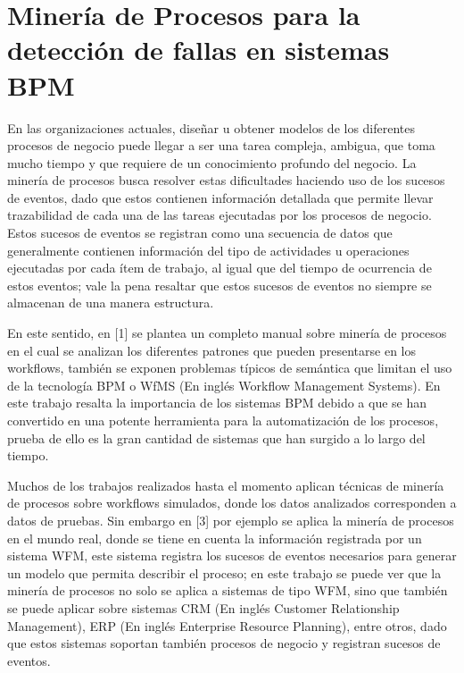 \section{Minería de Procesos para la detección de fallas en sistemas BPM} %
\label{section1.3}

En las organizaciones actuales, diseñar u obtener modelos de los diferentes procesos de negocio puede llegar a ser una tarea compleja, ambigua, que toma mucho tiempo y que requiere de un conocimiento profundo del negocio. La minería de procesos busca resolver estas dificultades haciendo uso de los sucesos de eventos, dado que estos contienen información detallada que permite llevar trazabilidad de cada una de las tareas ejecutadas por los procesos de negocio. Estos sucesos de eventos se registran como una secuencia de datos que generalmente contienen información del tipo de actividades u operaciones ejecutadas por cada ítem de trabajo, al igual que del tiempo de ocurrencia de estos eventos; vale la pena resaltar que estos sucesos de eventos no siempre se almacenan de una manera estructura. %

En este sentido, en [1] se plantea un completo manual sobre minería de procesos en el cual se analizan los diferentes patrones que pueden presentarse en los workflows, también se exponen problemas típicos de semántica que limitan el uso de la tecnología BPM o WfMS (En inglés Workflow Management Systems). En este trabajo resalta la importancia de los sistemas BPM debido a que se han convertido en una potente herramienta para la automatización de los procesos, prueba de ello es la gran cantidad de sistemas que han surgido a lo largo del tiempo.

Muchos de los trabajos realizados hasta el momento aplican técnicas de minería de procesos sobre workflows simulados, donde los datos analizados corresponden a datos de pruebas. Sin embargo en [3] por ejemplo se aplica la minería de procesos en el mundo real, donde se tiene en cuenta la información registrada por un sistema WFM, este sistema registra los sucesos de eventos necesarios para generar un modelo que permita describir el proceso; en este trabajo se puede ver que la minería de procesos no solo se aplica a sistemas de tipo WFM, sino que también se puede aplicar sobre sistemas CRM (En inglés Customer Relationship Management), ERP (En inglés Enterprise Resource Planning), entre otros, dado que estos sistemas soportan también procesos de negocio y registran sucesos de eventos.

